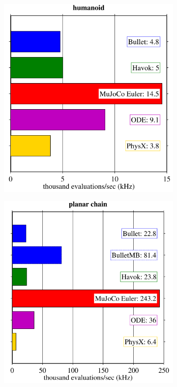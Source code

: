 \begin{figure}

    \begin{subfigure}{0.31\textwidth}
      \includegraphics[width=\linewidth]{figures/BulletCom1.png}
      \caption{} \label{fig:1a}
    \end{subfigure}%
    \hspace*{\fill}   %
    \begin{subfigure}{0.31\textwidth}
      \includegraphics[width=\linewidth]{figures/BulletCom2.png}

\end{subfigure}
\end{figure}
